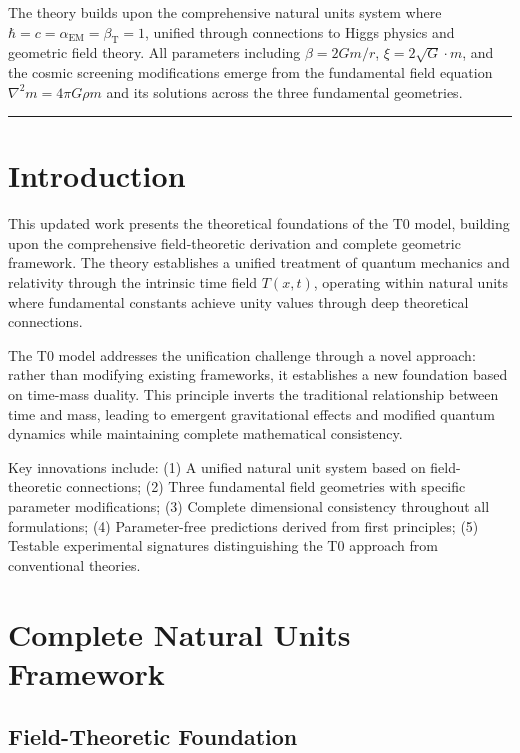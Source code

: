 \documentclass[twocolumn,aps,prl]{revtex4-2}
\newcommand{\Tfieldt}{T(x,t)}
\begin{document}
	The theory builds upon the comprehensive natural units system where \(\hbar = c = \alpha_{\text{EM}} = \beta_{\text{T}} = 1\), unified through connections to Higgs physics and geometric field theory. All parameters including \(\beta = 2Gm/r\), \(\xi = 2\sqrt{G} \cdot m\), and the cosmic screening modifications emerge from the fundamental field equation \(\nabla^2 m = 4\pi G \rho m\) and its solutions across the three fundamental geometries.
	
	\begin{center}
		\rule{\linewidth}{0.5pt}
	\end{center}
	
	\section{Introduction}
	\label{sec:introduction}
	
	This updated work presents the theoretical foundations of the T0 model, building upon the comprehensive field-theoretic derivation and complete geometric framework. The theory establishes a unified treatment of quantum mechanics and relativity through the intrinsic time field \(\Tfieldt\), operating within natural units where fundamental constants achieve unity values through deep theoretical connections.
	
	The T0 model addresses the unification challenge through a novel approach: rather than modifying existing frameworks, it establishes a new foundation based on time-mass duality. This principle inverts the traditional relationship between time and mass, leading to emergent gravitational effects and modified quantum dynamics while maintaining complete mathematical consistency.
	
	Key innovations include: (1) A unified natural unit system based on field-theoretic connections; (2) Three fundamental field geometries with specific parameter modifications; (3) Complete dimensional consistency throughout all formulations; (4) Parameter-free predictions derived from first principles; (5) Testable experimental signatures distinguishing the T0 approach from conventional theories.
	
	\section{Complete Natural Units Framework}
	\label{sec:complete_natural_units}
	
	\subsection{Field-Theoretic Foundation}
	\label{subsec:field_theoretic_foundation}
	
\end{document}
